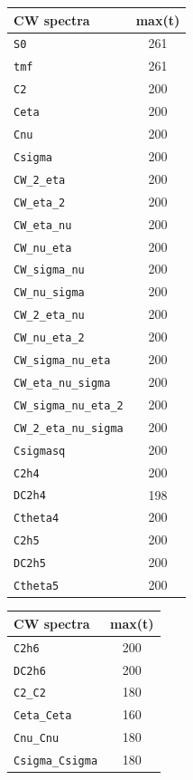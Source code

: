 \begin{table}
\begin{tabular}{|l|c|}\hline
CW spectra & max(t)\\\hline
\texttt{S0} & 261\\\hline
\texttt{tmf} & 261\\\hline
\texttt{C2} & 200\\\hline
\texttt{Ceta} & 200\\\hline
\texttt{Cnu} & 200\\\hline
\texttt{Csigma} & 200\\\hline
\texttt{CW\_2\_eta} & 200\\\hline
\texttt{CW\_eta\_2} & 200\\\hline
\texttt{CW\_eta\_nu} & 200\\\hline
\texttt{CW\_nu\_eta} & 200\\\hline
\texttt{CW\_sigma\_nu} & 200\\\hline
\texttt{CW\_nu\_sigma} & 200\\\hline
\texttt{CW\_2\_eta\_nu} & 200\\\hline
\texttt{CW\_nu\_eta\_2} & 200\\\hline
\texttt{CW\_sigma\_nu\_eta} & 200\\\hline
\texttt{CW\_eta\_nu\_sigma} & 200\\\hline
\texttt{CW\_sigma\_nu\_eta\_2} & 200\\\hline
\texttt{CW\_2\_eta\_nu\_sigma} & 200\\\hline
\texttt{Csigmasq} & 200\\\hline
\texttt{C2h4} & 200\\\hline
\texttt{DC2h4} & 198\\\hline
\texttt{Ctheta4} & 200\\\hline
\texttt{C2h5} & 200\\\hline
\texttt{DC2h5} & 200\\\hline
\texttt{Ctheta5} & 200\\\hline
\end{tabular}
\begin{tabular}{|l|c|}\hline
CW spectra & max(t)\\\hline
\texttt{C2h6} & 200\\\hline
\texttt{DC2h6} & 200\\\hline
\texttt{C2\_C2} & 180\\\hline
\texttt{Ceta\_Ceta} & 160\\\hline
\texttt{Cnu\_Cnu} & 180\\\hline
\texttt{Csigma\_Csigma} & 180\\\hline

\end{tabular}
\end{table}
